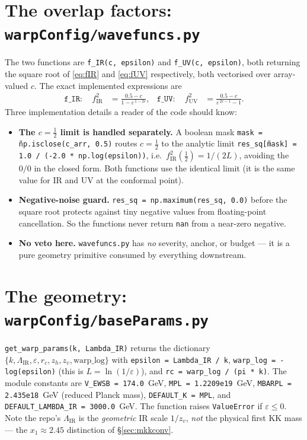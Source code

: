 \documentclass[11pt]{article}
\newcommand{\LIR}{\Lambda_{\mathrm{IR}}}
\newcommand{\half}{\tfrac{1}{2}}
\newcommand{\eps}{\varepsilon}
\newcommand{\fIR}{f_{\mathrm{IR}}}
\newcommand{\fUV}{f_{\mathrm{UV}}}
\newcommand{\code}[1]{\texttt{#1}}
\theoremstyle{definition}
\begin{document}
\section{The overlap factors: \code{warpConfig/wavefuncs.py}}
\label{sec:codeff}

The two functions are \code{f\_IR(c, epsilon)} and \code{f\_UV(c, epsilon)}, both
returning the square root of \eqref{eq:fIR} and \eqref{eq:fUV} respectively, both
vectorised over array-valued $c$. The exact implemented expressions are
\begin{align}
\code{f\_IR}:\quad \fIR^2 &= \frac{0.5-c}{1-\eps^{\,1-2c}}, &
\code{f\_UV}:\quad \fUV^2 &= \frac{0.5-c}{\eps^{\,2c-1}-1}.
\end{align}
Three implementation details a reader of the code should know:
\begin{itemize}[leftmargin=1.4em]
\item \textbf{The $c=\half$ limit is handled separately.} A boolean mask
\code{mask = \~np.isclose(c\_arr, 0.5)} routes $c=\half$ to the analytic limit
\code{res\_sq[\~mask] = 1.0 / (-2.0 * np.log(epsilon))}, i.e.\ $\fIR^2(\half)=1/(2L)$,
avoiding the $0/0$ in the closed form. Both functions use the identical limit (it
is the same value for IR and UV at the conformal point).
\item \textbf{Negative-noise guard.} \code{res\_sq = np.maximum(res\_sq, 0.0)}
before the square root protects against tiny negative values from floating-point
cancellation. So the functions never return \code{nan} from a near-zero negative.
\item \textbf{No veto here.} \code{wavefuncs.py} has \emph{no} severity, anchor, or
budget --- it is a pure geometry primitive consumed by everything downstream.
\end{itemize}

\section{The geometry: \code{warpConfig/baseParams.py}}
\label{sec:codegeom}

\code{get\_warp\_params(k, Lambda\_IR)} returns the dictionary
$\{k,\LIR,\eps,r_c,z_h,z_v,\text{warp\_log}\}$ with
\code{epsilon = Lambda\_IR / k}, \code{warp\_log = -log(epsilon)} (this is
$L=\ln(1/\eps)$), and \code{rc = warp\_log / (pi * k)}. The module constants are
\code{V\_EWSB = 174.0}~GeV, \code{MPL = 1.2209e19}~GeV,
\code{MBARPL = 2.435e18}~GeV (reduced Planck mass),
\code{DEFAULT\_K = MPL}, and \code{DEFAULT\_LAMBDA\_IR = 3000.0}~GeV. The function
raises \code{ValueError} if $\eps\le0$. Note the repo's $\LIR$ is the
\emph{geometric} IR scale $1/z_v$, \emph{not} the physical first KK mass --- the
$x_1\approx2.45$ distinction of \S\ref{sec:mkkconv}.
\end{document}
